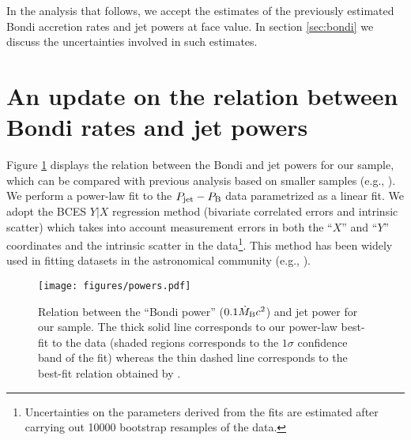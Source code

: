 \documentclass[useAMS,usenatbib]{mn2e}
\begin{document}
In the analysis that follows, we accept the estimates of the previously estimated Bondi accretion rates and jet powers at face value. In section \ref{sec:bondi} we discuss the uncertainties involved in such estimates.







\section{An update on the relation between Bondi rates and jet powers}	\label{sec:corr}

Figure \ref{fig:powers} displays the relation between the Bondi and jet powers for our sample, which can be compared with previous analysis based on smaller samples (e.g., \citealt{Allen06}). 
We perform a power-law fit to the $P_{\rm jet}-P_{\rm B}$ data parametrized as a linear fit. We adopt the BCES $Y|X$ regression method (bivariate correlated errors and intrinsic scatter) \citep{Akritas96bces} which takes into account measurement errors in both the ``$X$'' and ``$Y$'' coordinates and the intrinsic scatter in the data\footnote{Uncertainties on the parameters derived from the fits are estimated after carrying out 10000 bootstrap resamples of the data.}. This method has been widely used in fitting datasets in the astronomical community (e.g., \citealt{Allen06,Nemmen12,Sifon13}). 

\begin{figure}
\centering
\texttt{[image: figures/powers.pdf]}
\caption{Relation between the ``Bondi power'' ($0.1 \dot{M}_{\rm B} c^2$) and jet power for our sample. The thick solid line corresponds to our power-law best-fit to the data (shaded regions corresponds to the $1\sigma$ confidence band of the fit) whereas the thin dashed line corresponds to the best-fit relation obtained by \citet{Allen06}. }
\label{fig:powers}
\end{figure}
\end{document}
